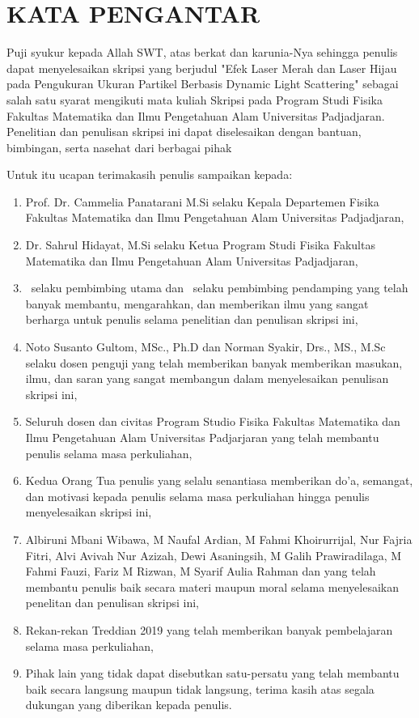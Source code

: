 \chapter*{\centering KATA PENGANTAR}

Puji syukur kepada Allah SWT, atas berkat dan karunia-Nya sehingga penulis dapat menyelesaikan
skripsi yang berjudul "Efek Laser Merah dan Laser Hijau pada Pengukuran Ukuran Partikel Berbasis
Dynamic Light Scattering" sebagai salah satu syarat mengikuti mata kuliah Skripsi pada Program
Studi Fisika Fakultas Matematika dan Ilmu Pengetahuan Alam Universitas Padjadjaran. Penelitian
dan penulisan skripsi ini dapat diselesaikan dengan bantuan, bimbingan, serta nasehat dari
berbagai pihak

Untuk itu ucapan terimakasih penulis sampaikan kepada: 

\begin{enumerate}
	\item Prof. Dr. Cammelia Panatarani M.Si selaku Kepala Departemen Fisika
Fakultas Matematika dan Ilmu Pengetahuan Alam Universitas Padjadjaran,
	\item Dr. Sahrul Hidayat, M.Si selaku Ketua Program Studi Fisika Fakultas
Matematika dan Ilmu Pengetahuan Alam Universitas Padjadjaran,
	\item \supervisorNameF ~selaku pembimbing utama dan \supervisorNameS ~selaku
pembimbing pendamping yang telah banyak membantu, mengarahkan, dan memberikan ilmu
yang sangat berharga untuk penulis selama penelitian dan penulisan skripsi ini,
	\item Noto Susanto Gultom, MSc., Ph.D dan Norman Syakir, Drs., MS., M.Sc selaku
dosen penguji yang telah memberikan banyak memberikan masukan, ilmu, dan saran yang
sangat membangun dalam menyelesaikan penulisan skripsi ini,
	\item Seluruh dosen dan civitas Program Studio Fisika Fakultas Matematika dan
Ilmu Pengetahuan Alam Universitas Padjarjaran yang telah membantu penulis selama masa
perkuliahan,
	\item Kedua Orang Tua penulis yang selalu senantiasa memberikan do'a, semangat,
dan motivasi kepada penulis selama masa perkuliahan hingga penulis menyelesaikan skripsi
ini,
	\item Albiruni Mbani Wibawa, M Naufal Ardian, M Fahmi Khoirurrijal, Nur Fajria Fitri,
Alvi Avivah Nur Azizah, Dewi Asaningsih, M Galih Prawiradilaga, M Fahmi Fauzi, 
Fariz M Rizwan, M Syarif Aulia
Rahman dan yang telah membantu penulis baik secara materi maupun moral selama menyelesaikan
penelitan dan penulisan skripsi ini,
	\item Rekan-rekan Treddian 2019 yang telah memberikan banyak pembelajaran selama 
masa perkuliahan,
	\item Pihak lain yang tidak dapat disebutkan satu-persatu yang telah membantu baik secara langsung maupun tidak langsung, terima kasih atas segala dukungan yang diberikan kepada penulis.
\end{enumerate}

